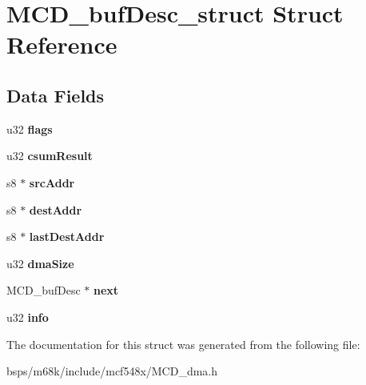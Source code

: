 \hypertarget{structMCD__bufDesc__struct}{}\section{M\+C\+D\+\_\+buf\+Desc\+\_\+struct Struct Reference}
\label{structMCD__bufDesc__struct}
\subsection*{Data Fields}
\begin{DoxyCompactItemize}
\item 
\mbox{\label{structMCD__bufDesc__struct_ae65eed8216bffd491a8e6808b1235f93}} 
u32 {\bfseries flags}
\item 
\mbox{\label{structMCD__bufDesc__struct_a102e337ffb30805d56642825d9727aa4}} 
u32 {\bfseries csum\+Result}
\item 
\mbox{\label{structMCD__bufDesc__struct_a18313e538b2d1ab520d1b59e737d8fa1}} 
s8 $\ast$ {\bfseries src\+Addr}
\item 
\mbox{\label{structMCD__bufDesc__struct_ac8b8e6103469e50029a080c7ac993983}} 
s8 $\ast$ {\bfseries dest\+Addr}
\item 
\mbox{\label{structMCD__bufDesc__struct_afbddb1c12e902f3398b1cb34da4c174d}} 
s8 $\ast$ {\bfseries last\+Dest\+Addr}
\item 
\mbox{\label{structMCD__bufDesc__struct_a7698eb5b66d6b062bc3a5257a762a3b7}} 
u32 {\bfseries dma\+Size}
\item 
\mbox{\label{structMCD__bufDesc__struct_ad90030ee0faab0008a36620fa5e1896f}} 
M\+C\+D\+\_\+buf\+Desc $\ast$ {\bfseries next}
\item 
\mbox{\label{structMCD__bufDesc__struct_a0b777d2349ed258d16a5ffb7408e83d0}} 
u32 {\bfseries info}
\end{DoxyCompactItemize}


The documentation for this struct was generated from the following file\+:\begin{DoxyCompactItemize}
\item 
bsps/m68k/include/mcf548x/M\+C\+D\+\_\+dma.\+h\end{DoxyCompactItemize}
